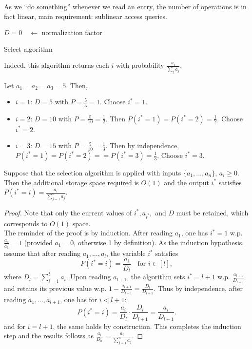 \begin{remark*}
As we ``do something'' whenever we read an entry, the number of operations is in fact linear, main requirement: sublinear access queries.
\end{remark*}
\begin{algorithm}[H]
\SetAlgoLined
{}
 \BlankLine
$D= 0 \quad \leftarrow$ normalization factor \\
\caption{Select algorithm}
\end{algorithm}
\begin{remark*}
Indeed, this algorithm returns each $i$ with probability $\frac{a_i}{\sum_j a_j}$.
\end{remark*}
\begin{example*}
Let $a_1=a_2=a_3 =5$. Then,
\begin{itemize}[itemsep=0pt]
	\item $i=1$: $D=5$ with $P=\frac{5}{5}=1$. Choose $i^* =1$.
	\item $i=2$: $D=10$ with $P=\frac{5}{10}=\frac{1}{2}$. Then $P(i^*=1)=P(i^*=2)=\frac{1}{2}$. Choose $i^* = 2$.
	\item $i=3$: $D=15$ with $P=\frac{5}{10}=\frac{1}{3}$. Then by independence, $P(i^*=1)=P(i^*=2)==P(i^*=3)=\frac{1}{3}$. Choose $i^* = 3$.
\end{itemize} 
\end{example*}
\begin{lemma}
\begin{mdframed}
Suppose that the selection algorithm is applied with inputs $\{a_1,...,a_n\}$, $a_i \geq 0$. Then the additional storage space required is $O(1)$ and the output $i^*$ satisfies $P(i^*=i) = \frac{a_i}{\sum_{j=1}^n a_j}$.
\end{mdframed}
\begin{proof}
Note that only the current values of $i^*, a_{i^*},$ and $D$ must be retained, which corresponds to $O(1)$ space.\\
The reminder of the proof is by induction. After reading $a_1$, one has $i^*=1$ w.p. $\frac{a_1}{a_1}=1$ (provided $a_1=0$, otherwise 1 by definition). As the induction hypothesis, assume that after reading $a_1,...,a_l$, the variable $i^*$ satisfies $$P(i^*=i) = \frac{a_i}{D_l}\quad \text{for } i \in [l],$$
where $D_l = \sum_{i=1}^l a_i$. Upon reading $a_{l+1}$, the algorithm sets $i^*=l+1$ w.p. $\frac{a_{l+1}}{D_{l+1}}$ and retains its previous value w.p. $1-\frac{a_{l+1}}{D_{l+1}}  = \frac{D_l}{D_{l+1}}$. Thus by independence, after reading $a_1,...,a_{l+1}$, one has for $i< l+1$: $$P(i^*=i)=\frac{a_i}{D_l}\cdot \frac{D_l}{D_{l+1}}=\frac{a_i}{D_{l+1}}.$$ and for $i=l+1$, the same holds by construction. This completes the induction step and the results follows as $\frac{a_i}{D_n} = \frac{a_i}{\sum_{j=1}^n a_j}$.
\end{proof}
\end{lemma}

